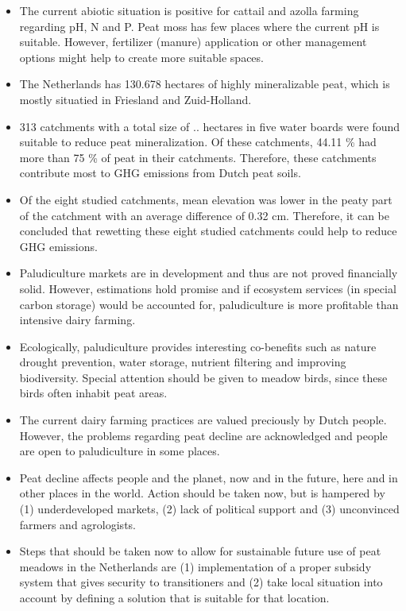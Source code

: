 \documentclass[a4paper,12pt]{scrbook}
\begin{document}
\begin{itemize}
\item The current abiotic situation is positive for cattail and azolla farming regarding pH, N and P. Peat moss has few places where the current pH is suitable. However, fertilizer (manure) application or other management options might help to create more suitable spaces.
\item The Netherlands has 130.678 hectares of highly mineralizable peat, which is mostly situatied in Friesland and Zuid-Holland. 
\item 313 catchments with a total size of .. hectares in five water boards were found suitable to reduce peat mineralization. Of these catchments, 44.11 \% had more than 75 \% of peat in their catchments. Therefore, these catchments contribute most to GHG emissions from Dutch peat soils.
\item Of the eight studied catchments, mean elevation was lower in the peaty part of the catchment with an average difference of 0.32 cm. Therefore, it can be concluded that rewetting these eight studied catchments could help to reduce GHG emissions.
\item Paludiculture markets are in development and thus are not proved financially solid. However, estimations hold promise and if ecosystem services (in special carbon storage) would be accounted for, paludiculture is more profitable than intensive dairy farming.
\item Ecologically, paludiculture provides interesting co-benefits such as nature drought prevention, water storage, nutrient filtering and improving biodiversity. Special attention should be given to meadow birds, since these birds often inhabit peat areas.
\item The current dairy farming practices are valued preciously by Dutch people. However, the problems regarding peat decline are acknowledged and people are open to paludiculture in some places. 
\item Peat decline affects people and the planet, now and in the future, here and in other places in the world. Action should be taken now, but is hampered by (1) underdeveloped markets, (2) lack of political support and (3) unconvinced farmers and agrologists. 
\item Steps that should be taken now to allow for sustainable future use of peat meadows in the Netherlands are (1) implementation of a proper subsidy system that gives security to transitioners and (2) take local situation into account by defining a solution that is suitable for that location.
\end{itemize}
\end{document}
